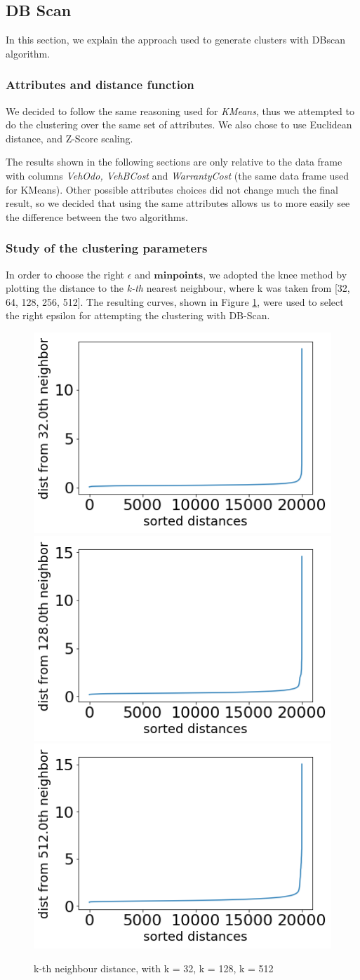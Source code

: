 \documentclass{article}
\begin{document}
	\subsection{DB Scan}
	In this section, we explain the approach used to generate clusters with DBscan algorithm.
	
	\subsubsection{Attributes and distance function}
	We decided to follow the same reasoning used for \emph{KMeans}, thus we attempted to do the clustering over the same set of attributes. We also chose to use Euclidean distance, and Z-Score scaling.
	
	The results shown in the following sections are only relative to the data frame with columns \emph{VehOdo, VehBCost} and \emph{WarrantyCost} (the same data frame used for KMeans). Other possible attributes choices did not change much the final result, so we decided that using the same attributes allows us to more easily see the difference between the two algorithms.
	
	
	\subsubsection{Study of the clustering parameters}
	In order to choose the right $\epsilon$ and $\mathbf{min points}$, we adopted the knee method by plotting the distance to the \emph{k-th} nearest neighbour, where k was taken from [32, 64, 128, 256, 512]. The resulting curves, shown in Figure \ref{fig:kth}, were used to select the right epsilon for attempting the clustering with DB-Scan. 
	
	\begin{figure}[]
		\centering
		\includegraphics[width=.32\textwidth]{a32}\hfill
		\includegraphics[width=.32\textwidth]{a128}\hfill
		\includegraphics[width=.32\textwidth]{a512}
		\caption{k-th neighbour distance, with k = 32, k = 128, k = 512}
		\label{fig:kth}
	\end{figure}
	
\end{document}
